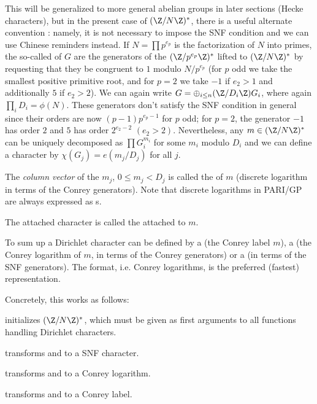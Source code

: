 This will be generalized to more general abelian groups in later sections
(Hecke characters), but in the present case of $(\Z/N\Z)^*$, there is a useful
alternate convention : namely, it is not necessary to impose the SNF
condition and we can use Chinese reminders instead. If $N = \prod p^{e_p}$ is
the factorization of $N$ into primes, the so-called 
of $G$ are the generators of the $(\Z/p^{e_p}\Z)^*$ lifted to $(\Z/N\Z)^*$ by
requesting that they be congruent to $1$ modulo $N/p^{e_p}$ (for $p$ odd we
take the smallest positive primitive root, and for $p = 2$ we take $-1$ if
$e_2 > 1$ and additionally $5$ if $e_2 > 2$). We can again write $G =
\oplus_{i\leq n} (\Z/D_i\Z) G_i$, where again $\prod_i D_i = \phi(N)$. These
generators don't satisfy the SNF condition in general since their orders are
now $(p-1)p^{e_p-1}$ for $p$ odd; for $p = 2$, the generator $-1$ has order
$2$ and $5$ has order $2^{e_2-2}$ $(e_2 > 2)$. Nevertheless, any $m\in
(\Z/N\Z)^*$ can be uniquely decomposed as $\prod G_i^{m_i}$ for some $m_i$
modulo $D_i$ and we can define a character by $\chi(G_j) = e(m_j / D_j)$ for
all $j$.

\item The \emph{column vector} of the $m_j$, $0 \leq m_j < D_j$ is called the
 of $m$ (discrete logarithm in terms of the Conrey
generators). Note that discrete logarithms in PARI/GP are always expressed as
s.

\item The attached character is called the 
attached to $m$.

To sum up a Dirichlet character can be defined by a  (the Conrey
label $m$), a  (the Conrey logarithm of $m$, in terms of the Conrey
generators) or a  (in  terms of the SNF generators). The 
format, i.e. Conrey logarithms, is the preferred (fastest) representation.

Concretely, this works as follows:

 initializes $(\Z/N\Z)^*$, which must be given as
first arguments to all functions handling Dirichlet characters.

 transforms  and  to a SNF character.

 transforms  and  to a Conrey logarithm.

 transforms  and  to a Conrey label.

